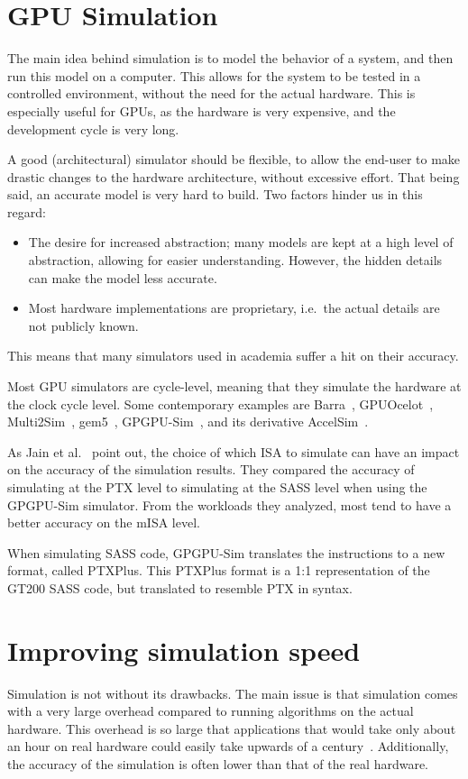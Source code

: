 \section{GPU Simulation}\label{sec:simulation}
The main idea behind simulation is to model the behavior of a system, and then run this model on a computer.
This allows for the system to be tested in a controlled environment, without the need for the actual hardware.
This is especially useful for GPUs, as the hardware is very expensive, and the development cycle is very long.

A good (architectural) simulator should be flexible, to allow the end-user to make drastic changes to the hardware architecture, without excessive effort.
That being said, an accurate model is very hard to build.
Two factors hinder us in this regard:
\begin{itemize}
    \item The desire for increased abstraction; many models are kept at a high level of abstraction, allowing for easier understanding.
    However, the hidden details can make the model less accurate.
    \item Most hardware implementations are proprietary, i.e.\ the actual details are not publicly known.
\end{itemize}
This means that many simulators used in academia suffer a hit on their accuracy.

Most GPU simulators are cycle-level, meaning that they simulate the hardware at the clock cycle level.
Some contemporary examples are Barra~\cite{barra}, GPUOcelot~\cite{ocelot}, Multi2Sim~\cite{multi2sim}, gem5~\cite{gem5}, GPGPU-Sim~\cite{gpgpu-sim}, and its derivative AccelSim~\cite{accelsim}.

As Jain et al.~\cite{sim-method} point out, the choice of which ISA to simulate can have an impact on the accuracy of the simulation results.
They compared the accuracy of simulating at the PTX level to simulating at the SASS level when using the GPGPU-Sim simulator.
From the workloads they analyzed, most tend to have a better accuracy on the mISA level.

When simulating SASS code, GPGPU-Sim translates the instructions to a new format, called PTXPlus.
This PTXPlus format is a 1:1 representation of the GT200 SASS code, but translated to resemble PTX in syntax.

\section{Improving simulation speed}\label{sec:improving-simulation-speed}
Simulation is not without its drawbacks.
The main issue is that simulation comes with a very large overhead compared to running algorithms on the actual hardware.
This overhead is so large that applications that would take only about an hour on real hardware could easily take upwards of a century~\cite{pks}.
Additionally, the accuracy of the simulation is often lower than that of the real hardware.

